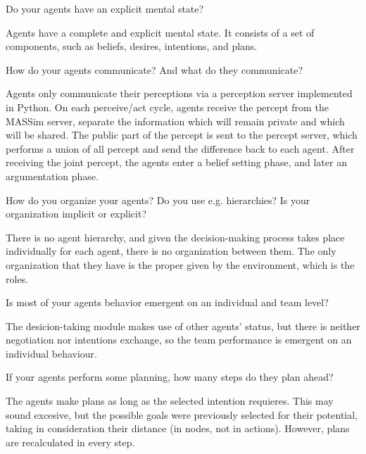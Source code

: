 \begin{question}
Do your agents have an explicit mental state?
\end{question}

Agents have a complete and explicit mental state. It consists of a set of
components, such as beliefs, desires, intentions, and plans. 

\begin{question}
How do your agents communicate? And what do they communicate?  
\end{question}

Agents only communicate their perceptions via a perception server implemented in
Python.  On each perceive/act cycle, agents receive the percept from the MASSim
server, separate the information which will remain private and which will be
shared.  The public part of the percept is sent to the percept server, which
performs a union of all percept and send the difference back to each agent.
After receiving the joint percept, the agents enter a belief setting phase, and
later an argumentation phase.

\begin{question}
How do you organize your agents? Do you use e.g. hierarchies? Is your
organization implicit or explicit?
\end{question}

There is no agent hierarchy, and given the decision-making process takes place
individually for each agent, there is no organization between them.  The only
organization that they have is the proper given by the environment, which is the
roles.

\begin{question}
Is most of your agents behavior emergent on an individual and team level?
\end{question}

The desicion-taking module makes use of other agents' status, but there is
neither negotiation nor intentions exchange, so the team performance is emergent
on an individual behaviour.

\begin{question}
If your agents perform some planning, how many steps do they plan ahead?
\end{question}

The agents make plans as long as the selected intention requieres. This may
sound excesive, but the possible goals were previously selected for their
potential, taking in consideration their distance (in nodes, not in actions).
However, plans are recalculated in every step.

